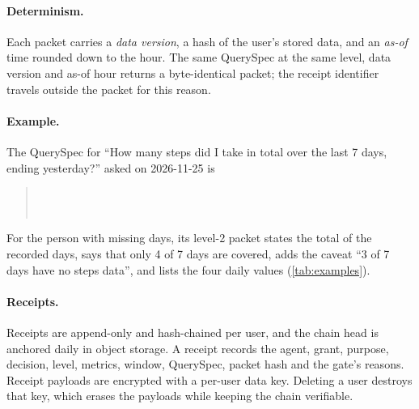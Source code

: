 \paragraph{Determinism.} Each packet carries a \emph{data version}, a hash of the user's stored data, and an
\emph{as-of} time rounded down to the hour. The same QuerySpec at the same level, data version and as-of hour returns a
byte-identical packet; the receipt identifier travels outside the packet for this reason.

\paragraph{Example.} The QuerySpec for ``How many steps did I take in total over the last 7 days, ending
yesterday?'' asked on 2026-11-25 is
\begin{quote}\small
{}\\
\\
\end{quote}
For the person with missing days, its level-2 packet states the total of the
recorded days, says that only 4 of 7 days are covered, adds the caveat ``3 of 7 days have no steps data'', and
lists the four daily values (\cref{tab:examples}).

\paragraph{Receipts.} Receipts are append-only and hash-chained per user, and the chain head is anchored daily in
object storage. A receipt records the agent, grant, purpose, decision, level, metrics, window, QuerySpec, packet
hash and the gate's reasons. Receipt payloads are encrypted with a per-user data key. Deleting a user destroys that
key, which erases the payloads while keeping the chain verifiable.
